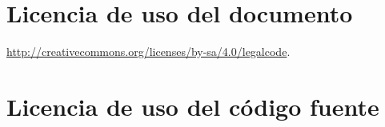 \chapter*{Licencia de uso del documento}

\begin{flushright}

  \doclicenseThis

  \url{http://creativecommons.org/licenses/by-sa/4.0/legalcode}.
\end{flushright}

\chapter*{Licencia de uso del código fuente}

